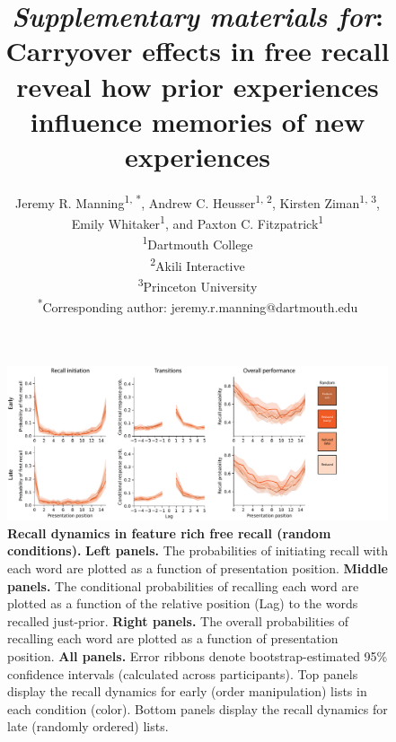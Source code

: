 \documentclass{article}
\title{\textit{Supplementary materials for}: Carryover effects in free recall reveal how prior experiences influence memories of new experiences}
\author{Jeremy R. Manning\textsuperscript{1, *}, Andrew C. Heusser\textsuperscript{1, 2}, Kirsten Ziman\textsuperscript{1, 3},\\Emily Whitaker\textsuperscript{1}, and Paxton C. Fitzpatrick\textsuperscript{1}\\\textsuperscript{1}Dartmouth College\\\textsuperscript{2}Akili Interactive\\\textsuperscript{3}Princeton University\\\textsuperscript{*}Corresponding author: jeremy.r.manning@dartmouth.edu}
\date{}
\begin{document}
\renewcommand{\figurename}{Supplementary Figure}


\setcounter{equation}{0}
\setcounter{figure}{0}
\setcounter{table}{0}
\setcounter{page}{1}
\setcounter{section}{0}
\makeatletter
\renewcommand{\theequation}{S\arabic{equation}}
\renewcommand{\thefigure}{S\arabic{figure}}
\renewcommand{\bibnumfmt}[1]{[S#1]}
\renewcommand{\citenumfont}[1]{S#1}

\maketitle

\begin{figure}[p] \centering
\includegraphics[width=\textwidth]{figures/recall_dynamics_random}

\caption{\textbf{Recall dynamics in feature rich free recall (random conditions).} \textbf{Left panels.} The probabilities of
initiating recall with each word are plotted as a function of presentation
position. \textbf{Middle panels.} The conditional probabilities of recalling
each word are plotted as a function of the relative position (Lag) to the words
recalled just-prior. \textbf{Right panels.} The overall probabilities of
recalling each word are plotted as a function of presentation position.
\textbf{All panels.} Error ribbons denote bootstrap-estimated 95\% confidence
intervals (calculated across participants). Top panels display the recall
dynamics for early (order manipulation) lists in each condition (color). Bottom
panels display the recall dynamics for late (randomly ordered) lists.}

    \label{fig:recall-dynamics-random}
\end{figure}
\end{document}

